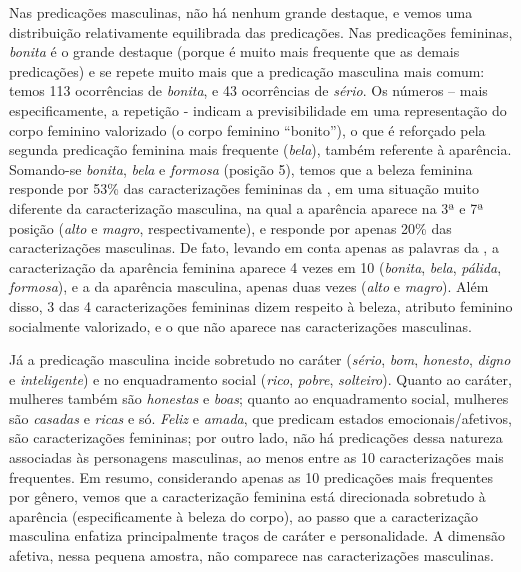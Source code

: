 \documentclass[portuguese]{textolivre}
\begin{document}
Nas predicações masculinas, não há nenhum grande destaque, e vemos uma distribuição relativamente equilibrada das predicações. Nas predicações femininas, \textit{bonita} é o grande destaque (porque é muito mais frequente que as demais predicações) e se repete muito mais que a predicação masculina mais comum: temos 113 ocorrências de \textit{bonita}, e 43 ocorrências de \textit{sério}. Os números – mais especificamente, a repetição - indicam a previsibilidade em uma representação do corpo feminino valorizado (o corpo feminino “bonito”), o que é reforçado pela segunda predicação feminina mais frequente (\textit{bela}), também referente à aparência. Somando-se \textit{bonita}, \textit{bela} e \textit{formosa} (posição 5), temos que a beleza feminina responde por 53\% das caracterizações femininas da , em uma situação muito diferente da caracterização masculina, na qual a aparência aparece na 3ª e 7ª posição (\textit{alto} e \textit{magro}, respectivamente), e responde por apenas 20\% das caracterizações masculinas.  De fato, levando em conta apenas as palavras da , a caracterização da aparência feminina aparece 4 vezes em 10 (\textit{bonita}, \textit{bela}, \textit{pálida}, \textit{formosa}), e a da aparência masculina, apenas duas vezes (\textit{alto} e \textit{magro}). Além disso, 3 das 4 caracterizações femininas dizem respeito à beleza, atributo feminino socialmente valorizado, e o que não aparece nas caracterizações masculinas.

Já a predicação masculina incide sobretudo no caráter (\textit{sério}, \textit{bom}, \textit{honesto}, \textit{digno} e \textit{inteligente}) e no enquadramento social (\textit{rico}, \textit{pobre}, \textit{solteiro}).  Quanto ao caráter, mulheres também são \textit{honestas} e \textit{boas}; quanto ao enquadramento social, mulheres são \textit{casadas} e \textit{ricas} e só. \textit{Feliz} e \textit{amada}, que predicam estados emocionais/afetivos, são caracterizações femininas; por outro lado, não há predicações dessa natureza associadas às personagens masculinas, ao menos entre as 10 caracterizações mais frequentes. Em resumo, considerando apenas as 10 predicações mais frequentes por gênero, vemos que a caracterização feminina está direcionada sobretudo à aparência (especificamente à beleza do corpo), ao passo que a caracterização masculina enfatiza principalmente traços de caráter e personalidade. A dimensão afetiva, nessa pequena amostra, não comparece nas caracterizações masculinas.
\end{document}
